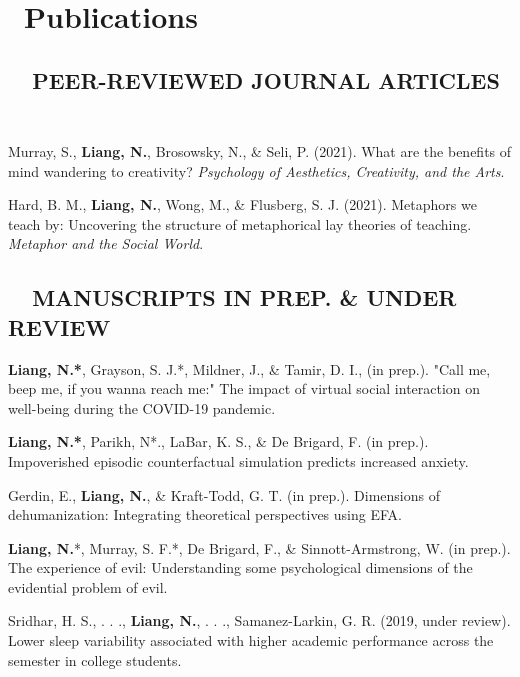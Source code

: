 \documentclass[10pt, a4paper, english]{resume}
\begin{document}
\section*{\faBook \ Publications}

\subsection*{\faBookmark\ \ PEER-REVIEWED JOURNAL ARTICLES \ }
{\footnotesize\begin{etaremune}
    \item Murray, S., {\bf Liang, N.}, Brosowsky, N., \& Seli, P. (2021). What are the benefits of mind wandering to creativity? \textsl{Psychology of Aesthetics, Creativity, and the Arts}. \href{https://osf.io/dwec2/}{\aiOSF} \href{https://doi.org/10.1037/aca0000420}{\aiDoi}
    \item Hard, B. M., {\bf Liang, N.}, Wong, M., \&  Flusberg, S. J. (2021). Metaphors we teach by: Uncovering the structure of metaphorical lay theories of teaching. \textsl{Metaphor and the Social World}. \href{https://doi.org/10.1075/msw.19021.har}{\aiDoi}
\end{etaremune}}

\subsection*{\faBookmark[regular]\ \ MANUSCRIPTS IN PREP. \& UNDER REVIEW \ }
{\footnotesize\begin{etaremune}
    \item {\bf Liang, N.*}, Grayson, S. J.*, Mildner, J., \& Tamir, D. I., (in prep.). "Call me, beep me, if you wanna reach me:" The impact of virtual social interaction on well-being during the COVID-19 pandemic. \href{https://osf.io/dwec2/}{\aiOSF}
    \item {\bf Liang, N.*}, Parikh, N*., LaBar, K. S., \& De Brigard, F. (in prep.). Impoverished episodic counterfactual simulation predicts increased anxiety.
    \item Gerdin, E., {\bf Liang, N.}, \&  Kraft-Todd, G. T. (in prep.). Dimensions of dehumanization: Integrating theoretical perspectives using EFA.\ \href{https://osf.io/4n6mw/}{\aiOSF}
    \item {\bf Liang, N.}*, Murray, S. F.*, De Brigard, F., \&  Sinnott-Armstrong, W. (in prep.). The experience of evil: Understanding some psychological dimensions of the evidential problem of evil. \href{https://osf.io/36cr5/}{\aiOSF}
    \item Sridhar, H. S., . . ., {\bf Liang, N.}, . . ., Samanez-Larkin, G. R. (2019, under review). Lower sleep variability associated with higher academic performance across the semester in college students. \href{https://psyarxiv.com/6x8su/}{\aiPsyArXiv}
\end{etaremune}}
\end{document}
